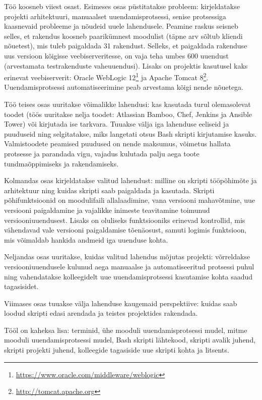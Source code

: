 \documentclass[12pt]{article}
\begin{document}
  Töö koosneb viiest osast. Esimeses osas püstitatakse probleem: kirjeldatakse projekti arhitektuuri, manuaalset uuendamisprotsessi, senise protsessiga kaasnevaid probleeme ja nõudeid uuele lahendusele. Peamine raskus seisneb selles, et rakendus koosneb paarikümnest moodulist (täpne arv sõltub kliendi nõuetest), mis tuleb paigaldada 31 rakendust. Selleks, et paigaldada rakenduse uus versioon kõigisse veebiserveritesse, on vaja teha umbes 600 uuendust (arvestamata testrakenduste vaheuuendusi). Lisaks on projektis kasutusel kaks erinevat veebiserverit: Oracle WebLogic 12\footnote{\url{https://www.oracle.com/middleware/weblogic}} ja Apache Tomcat 8\footnote{\url{http://tomcat.apache.org}}. Uuendamisprotsessi automatiseerimine peab arvestama kõigi nende nõuetega.
  
  Töö teises osas uuritakse võimalikke lahendusi: kas kasutada turul olemasolevat toodet (töös uuritakse nelja toodet: Atlassian Bamboo, Chef, Jenkins ja Ansible Tower) või kirjutada ise tarkvara. Tuuakse välja iga lahenduse eeliseid ja puuduseid ning selgitatakse, miks langetati otsus Bash skripti kirjutamise kasuks. Valmistoodete peamised puudused on nende maksumus, võimetus hallata protsesse ja parandada vigu, vajadus kulutada palju aega toote tundmaõppimiseks ja rakendamiseks.
  
  Kolmandas osas kirjeldatakse valitud lahendust: milline on skripti tööpõhimõte ja arhitektuur ning kuidas skripti saab paigaldada ja kasutada. Skripti põhifunk\-tsioonid on moodulifaili allalaadimine, vana versiooni mahavõtmine, uue versiooni paigaldamine ja vajalikke inimeste teavitamine toimunud versiooniuuendusest. Lisaks on oluliseks funktsiooniks erinevad kontrollid, mis vähendavad vale versiooni paigaldamise tõenäosust, samuti logimis funktsioon, mis võimaldab hankida andmeid iga uuenduse kohta.
  
  Neljandas osas uuritakse, kuidas valitud lahendus mõjutas projekti: võrreldakse versiooniuuendusele kulunud aega manuaalse ja automatiseeritud protsessi puhul ning vahendatakse kolleegidelt uue uuendamisprotsessi kasutamise kohta saadud tagasisidet.
  
  Viimases osas tuuakse välja lahenduse kaugemaid perspektiive: kuidas saab loodud skripti edasi arendada ja teistes projektides rakendada.
  
  Tööl on kaheksa lisa: terminid, ühe mooduli uuendamisprotsessi mudel, mitme mooduli uuendamisprotsessi mudel, Bash skripti lähtekood, skripti avalik juhend, skripti projekti juhend, kolleegide tagasiside uue skripti kohta ja litsents.
  
\end{document}

